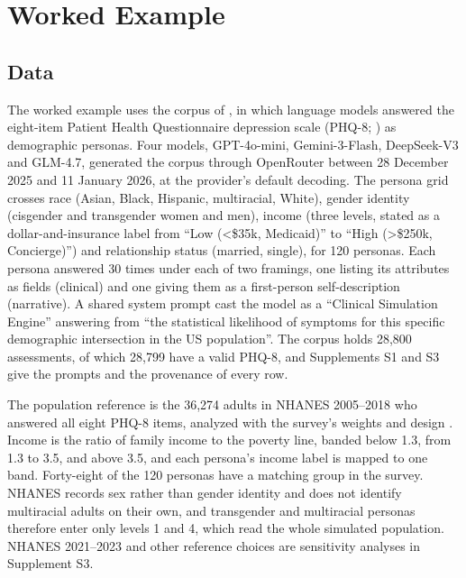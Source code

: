 
\section{Worked Example}
\label{sec:data}

\subsection{Data}

The worked example uses the corpus of \citet{keough2026plausible}, in which language models answered the eight-item Patient Health Questionnaire depression scale (PHQ-8; \citealp{kroenke2009phq8}) as demographic personas.
Four models, GPT-4o-mini, Gemini-3-Flash, DeepSeek-V3 and GLM-4.7, generated the corpus through OpenRouter between 28 December 2025 and 11 January 2026, at the provider's default decoding. %
The persona grid crosses race (Asian, Black, Hispanic, multiracial, White), gender identity (cisgender and transgender women and men), income (three levels, stated as a dollar-and-insurance label from ``Low (<\$35k, Medicaid)'' to ``High (>\$250k, Concierge)'') and relationship status (married, single), for 120 personas.
Each persona answered 30 times under each of two framings, one listing its attributes as fields (clinical) and one giving them as a first-person self-description (narrative).
A shared system prompt cast the model as a ``Clinical Simulation Engine'' answering from ``the statistical likelihood of symptoms for this specific demographic intersection in the US population''.
The corpus holds 28,800 assessments, of which 28,799 have a valid PHQ-8, and Supplements S1 and S3 give the prompts and the provenance of every row. %

The population reference is the 36,274 adults in NHANES 2005--2018 who answered all eight PHQ-8 items, analyzed with the survey's weights and design \citep{johnson2013nhanes,chen2018nhanes,nchs2018analytic}. %
Income is the ratio of family income to the poverty line, banded below 1.3, from 1.3 to 3.5, and above 3.5, and each persona's income label is mapped to one band.
Forty-eight of the 120 personas have a matching group in the survey.
NHANES records sex rather than gender identity and does not identify multiracial adults on their own, and transgender and multiracial personas therefore enter only levels 1 and 4, which read the whole simulated population.
NHANES 2021--2023 and other reference choices are sensitivity analyses in Supplement S3.

